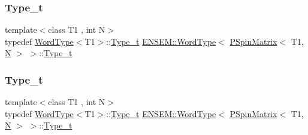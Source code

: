 \subsubsection{\texorpdfstring{Type\_t}{Type\_t}\hspace{0.1cm}{\footnotesize\ttfamily [1/3]}}
{\footnotesize\ttfamily template$<$class T1 , int N$>$ \\
typedef \mbox{\hyperlink{structENSEM_1_1WordType}{Word\+Type}}$<$T1$>$\+::\mbox{\hyperlink{structENSEM_1_1WordType_3_01PSpinMatrix_3_01T1_00_01N_01_4_01_4_a497367a5083738a899e7e09e43127eec}{Type\+\_\+t}} \mbox{\hyperlink{structENSEM_1_1WordType}{E\+N\+S\+E\+M\+::\+Word\+Type}}$<$ \mbox{\hyperlink{classENSEM_1_1PSpinMatrix}{P\+Spin\+Matrix}}$<$ T1, \mbox{\hyperlink{adat__devel_2lib_2hadron_2operator__name__util_8cc_a7722c8ecbb62d99aee7ce68b1752f337}{N}} $>$ $>$\+::\mbox{\hyperlink{structENSEM_1_1WordType_3_01PSpinMatrix_3_01T1_00_01N_01_4_01_4_a497367a5083738a899e7e09e43127eec}{Type\+\_\+t}}}

\mbox{\label{structENSEM_1_1WordType_3_01PSpinMatrix_3_01T1_00_01N_01_4_01_4_a497367a5083738a899e7e09e43127eec}} 
\subsubsection{\texorpdfstring{Type\_t}{Type\_t}\hspace{0.1cm}{\footnotesize\ttfamily [2/3]}}
{\footnotesize\ttfamily template$<$class T1 , int N$>$ \\
typedef \mbox{\hyperlink{structENSEM_1_1WordType}{Word\+Type}}$<$T1$>$\+::\mbox{\hyperlink{structENSEM_1_1WordType_3_01PSpinMatrix_3_01T1_00_01N_01_4_01_4_a497367a5083738a899e7e09e43127eec}{Type\+\_\+t}} \mbox{\hyperlink{structENSEM_1_1WordType}{E\+N\+S\+E\+M\+::\+Word\+Type}}$<$ \mbox{\hyperlink{classENSEM_1_1PSpinMatrix}{P\+Spin\+Matrix}}$<$ T1, \mbox{\hyperlink{adat__devel_2lib_2hadron_2operator__name__util_8cc_a7722c8ecbb62d99aee7ce68b1752f337}{N}} $>$ $>$\+::\mbox{\hyperlink{structENSEM_1_1WordType_3_01PSpinMatrix_3_01T1_00_01N_01_4_01_4_a497367a5083738a899e7e09e43127eec}{Type\+\_\+t}}}

\mbox{\label{structENSEM_1_1WordType_3_01PSpinMatrix_3_01T1_00_01N_01_4_01_4_a497367a5083738a899e7e09e43127eec}} 
